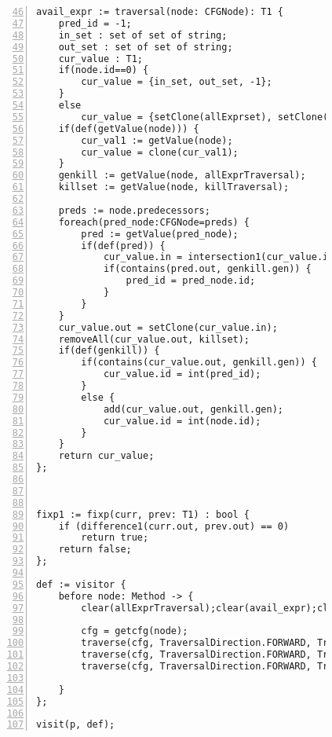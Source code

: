 \begin{figure}[ht!]
\begin{lstlisting}[numbers=left, tabsize=4, escapechar=@, caption={Common subexpression detection},label={lst:csd-code},firstline=46, firstnumber=46,lastline=101]
avail_expr := traversal(node: CFGNode): T1 {
	pred_id = -1;
	in_set : set of set of string;
	out_set : set of set of string;
	cur_value : T1;
	if(node.id==0) {
		cur_value = {in_set, out_set, -1};
	}
	else
		cur_value = {setClone(allExprset), setClone(allExprset), -1};
	if(def(getValue(node))) {
		cur_val1 := getValue(node);
		cur_value = clone(cur_val1);
	}
	genkill := getValue(node, allExprTraversal);
	killset := getValue(node, killTraversal);

	preds := node.predecessors;
	foreach(pred_node:CFGNode=preds) {	
		pred := getValue(pred_node);
		if(def(pred)) {
			cur_value.in = intersection1(cur_value.in, pred.out);
			if(contains(pred.out, genkill.gen)) {
				pred_id = pred_node.id;
			}
		}
	}
	cur_value.out = setClone(cur_value.in);
	removeAll(cur_value.out, killset);
	if(def(genkill)) {
		if(contains(cur_value.out, genkill.gen)) {
			cur_value.id = int(pred_id);
		}
		else {
			add(cur_value.out, genkill.gen);
			cur_value.id = int(node.id);
		}
	}
	return cur_value;
};



fixp1 := fixp(curr, prev: T1) : bool {
	if (difference1(curr.out, prev.out) == 0)
		return true;	
	return false;
};

def := visitor {
	before node: Method -> {
		clear(allExprTraversal);clear(avail_expr);clear(killTraversal);clear(allExprset);

		cfg = getcfg(node);
		traverse(cfg, TraversalDirection.FORWARD, TraversalKind.HYBRID, allExprTraversal);
		traverse(cfg, TraversalDirection.FORWARD, TraversalKind.HYBRID, killTraversal);
		traverse(cfg, TraversalDirection.FORWARD, TraversalKind.HYBRID, avail_expr, fixp1);
			
	}
};

visit(p, def);
\end{lstlisting}
\end{figure}